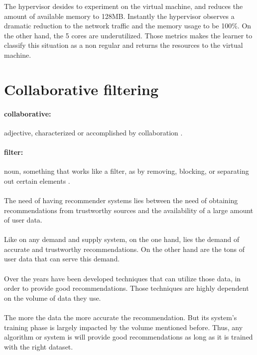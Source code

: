 \begin{description}
	The hypervisor desides to experiment on the virtual machine, and reduces the amount of available memory to 128MB. Instantly the hypervisor observes a dramatic reduction to the network traffic and the memory usage to be 100\%. On the other hand, the 5 cores are underutilized. Those metrics makes the learner to classify this situation as a non regular and returns the resources to the virtual machine.
	
\end{description}

\section{Collaborative filtering}
\paragraph{collaborative:} adjective, characterized or accomplished by collaboration \cite{Dictionary.com2017}.
\paragraph{filter:} noun, something that works like a filter, as by removing, blocking, or separating out certain elements \cite{Dictionary.com2017}.

\paragraph{}The need of having recommender systems lies between the need of obtaining recommendations from trustworthy sources and the availability of a large amount of user data.
\paragraph{}Like on any demand and supply system, on the one hand, lies the demand of accurate and trustworthy recommendations. On the other hand are the tons of user data that can serve this demand.
\paragraph{}Over the years have been developed techniques that can utilize those data, in order to provide good recommendations. Those techniques are highly dependent on the volume of data they use. 

\paragraph{}The more the data the more accurate the recommendation. But its system's training phase is largely impacted by the volume mentioned before. Thus, any algorithm or system is will provide good recommendations as long as it is trained with the right dataset.

